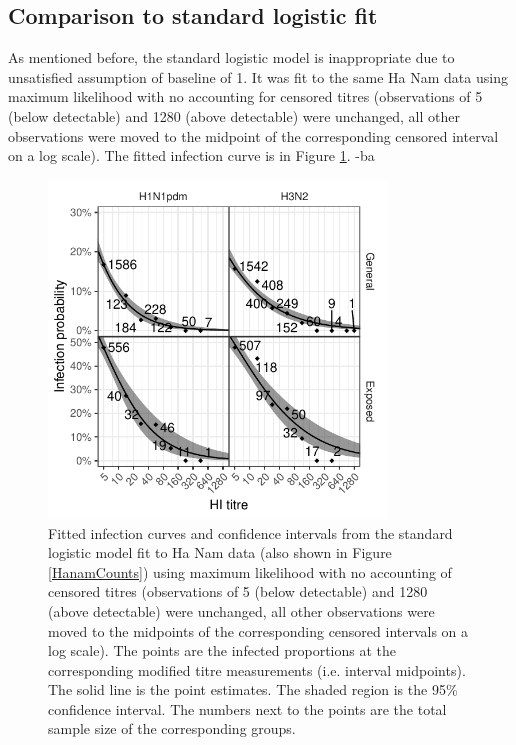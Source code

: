 \documentclass[12pt]{article}
\begin{document}
\pagebreak
\subsection{Comparison to standard logistic fit}

As mentioned before, the standard logistic model is inappropriate due to unsatisfied assumption of baseline of 1. It was fit to the same Ha Nam data using maximum likelihood with no accounting for censored titres (observations of 5 (below detectable) and 1280 (above detectable) were unchanged, all other observations were moved to the midpoint of the corresponding censored interval on a log scale). The fitted infection curve is in Figure \ref{lr-inf}.
-ba
\begin{figure}[htp]
	\centering
	\includegraphics[width=0.8\textwidth]{../fit-logistic-plot/hanam-hi-inf.pdf}
	\caption{
	Fitted infection curves and confidence intervals from the standard logistic model fit to Ha Nam data (also shown in Figure \ref{HanamCounts}) using maximum likelihood with no accounting of censored titres (observations of 5 (below detectable) and 1280 (above detectable) were unchanged, all other observations were moved to the midpoints of the corresponding censored intervals on a log scale). The points are the infected proportions at the corresponding modified titre measurements (i.e. interval midpoints). The solid line is the point estimates. The shaded region is the 95\% confidence interval. The numbers next to the points are the total sample size of the corresponding groups.
	}
	\label{lr-inf}
\end{figure}
\end{document}
